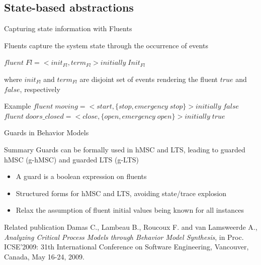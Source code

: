 \subsection{State-based abstractions}

\begin{frame}{Capturing state information with Fluents}
  \begin{block}{Fluents capture the system state through the occurrence of events \cite{Milner89}}
	  \begin{center}
		  $fluent\;Fl = <init_{Fl}, term_{Fl}> initially\;Init_{Fl}$
	  \end{center}
	  \vspace{-0.4cm}
	  where $init_{Fl}$ and $term_{Fl}$ are disjoint set of events rendering the fluent $true$ and $false$, respectively
  \end{block}
  \begin{block}{Example}
	  \small
	  $fluent\;moving = <start, \{stop, emergency\;stop\}> initially\;false$
	  $fluent\;doors\_closed = <close, \{open, emergency\;open\}> initially\;true$
  \end{block}
\end{frame}

\begin{frame}{Guards in Behavior Models}
  \small
  \begin{block}{Summary}
	  Guards can be formally used in hMSC and LTS, leading to guarded hMSC (g-hMSC) and guarded LTS (g-LTS)
	  \begin{itemize}
	         \item A guard is a boolean expression on fluents
	         \item Structured forms for hMSC and LTS, avoiding state/trace explosion
	         \item Relax the assumption of fluent initial values being known for all instances
	  \end{itemize}
  \end{block}
  \begin{block}{Related publication}
	  \scriptsize
	  Damas C., Lambeau B., Roucoux F. and van Lamsweerde A., \emph{Analyzing Critical Process Models through Behavior Model Synthesis},
	  in Proc. ICSE'2009: 31th International Conference on Software Engineering, Vancouver, Canada, May 16-24, 2009. 
  \end{block}
\end{frame}

